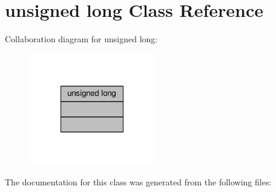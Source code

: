 \hypertarget{classunsigned_01long}{\section{unsigned long Class Reference}
\label{classunsigned_01long}
}


Collaboration diagram for unsigned long\-:
\nopagebreak
\begin{figure}[H]
\begin{center}
\leavevmode
\includegraphics[width=156pt]{classunsigned_01long__coll__graph}
\end{center}
\end{figure}


The documentation for this class was generated from the following files\-: